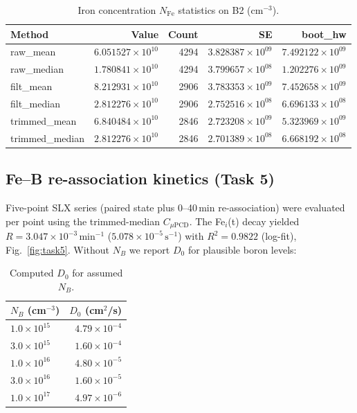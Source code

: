 \documentclass[12pt,a4paper]{article}
\begin{document}
\begin{table}[H]
\centering
\caption{Iron concentration $N_{\mathrm{Fe}}$ statistics on B2 (cm$^{-3}$).}
\begin{tabular}{lrrrr}
\toprule
Method & Value & Count & SE & boot\_hw \\
\midrule
raw\_mean      & $6.051527\times10^{10}$ & 4294 & $3.828387\times10^{09}$ & $7.492122\times10^{09}$ \\
raw\_median    & $1.780841\times10^{10}$ & 4294 & $3.799657\times10^{08}$ & $1.202276\times10^{09}$ \\
filt\_mean     & $8.212931\times10^{10}$ & 2906 & $3.783353\times10^{09}$ & $7.452658\times10^{09}$ \\
filt\_median   & $2.812276\times10^{10}$ & 2906 & $2.752516\times10^{08}$ & $6.696133\times10^{08}$ \\
trimmed\_mean  & $6.840484\times10^{10}$ & 2846 & $2.723208\times10^{09}$ & $5.323969\times10^{09}$ \\
trimmed\_median& $2.812276\times10^{10}$ & 2846 & $2.701389\times10^{08}$ & $6.668192\times10^{08}$ \\
\bottomrule
\end{tabular}
\label{tab:NFestats}
\end{table}

\subsection{Fe--B re-association kinetics (Task 5)}
Five-point SLX series (paired state plus 0--40\,min re-association) were evaluated per point using the trimmed-median $C_{\mu\mathrm{PCD}}$. The Fe$_i$(t) decay yielded $R=3.047\times10^{-3}\,\mathrm{min^{-1}}$ ($5.078\times10^{-5}\,\mathrm{s^{-1}}$) with $R^2=0.9822$ (log-fit), Fig.~\ref{fig:task5}. Without $N_B$ we report $D_0$ for plausible boron levels:

\begin{table}[H]
\centering
\caption{Computed $D_0$ for assumed $N_B$.}
\begin{tabular}{lr}
\toprule
$N_B$ (cm$^{-3}$) & $D_0$ (cm$^{2}$/s) \\
\midrule
$1.0\times10^{15}$ & $4.79\times10^{-4}$ \\
$3.0\times10^{15}$ & $1.60\times10^{-4}$ \\
$1.0\times10^{16}$ & $4.80\times10^{-5}$ \\
$3.0\times10^{16}$ & $1.60\times10^{-5}$ \\
$1.0\times10^{17}$ & $4.97\times10^{-6}$ \\
\bottomrule
\end{tabular}
\label{tab:D0}
\end{table}
\end{document}
